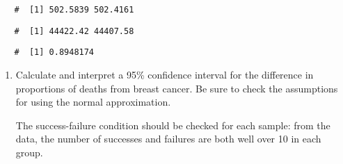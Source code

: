 \documentclass[letterpaper,12pt,twoside,]{pinp}
\begin{document}
\begin{enumerate}
\begin{Shaded}
\begin{Highlighting}[]
\OperatorTok{*}
\end{Highlighting}
\end{Shaded}

  \begin{ShadedResult}
   \begin{verbatim}
   #  [1] 502.5839 502.4161
   \end{verbatim}
   \end{ShadedResult}

\begin{Shaded}
\begin{Highlighting}[]
\OperatorTok{*}\NormalTok{(} \OperatorTok{-}\StringTok{ }
\end{Highlighting}
\end{Shaded}

  \begin{ShadedResult}
   \begin{verbatim}
   #  [1] 44422.42 44407.58
   \end{verbatim}
   \end{ShadedResult}

\begin{Shaded}
\begin{Highlighting}[]
\NormalTok{(}\OperatorTok{$}
\end{Highlighting}
\end{Shaded}

  \begin{ShadedResult}
   \begin{verbatim}
   #  [1] 0.8948174
   \end{verbatim}
   \end{ShadedResult}

  \begin{enumerate}
  \def\labelenumii{\alph{enumii})}
  \setcounter{enumii}{2}
  \item
    Calculate and interpret a 95\% confidence interval for the
    difference in proportions of deaths from breast cancer. Be sure to
    check the assumptions for using the normal approximation.

    \color{blue}

    The success-failure condition should be checked for each sample:
    from the data, the number of successes and failures are both well
    over 10 in each group.


\end{enumerate}
\end{enumerate}
\end{document}
